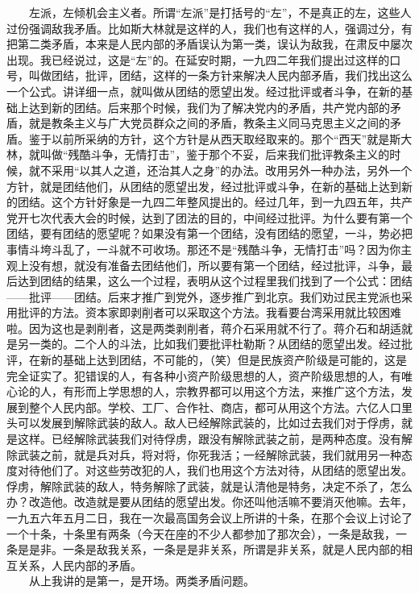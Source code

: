 \documentclass[cn,11pt,chinese]{elegantbook}
\begin{document}
　　左派，左倾机会主义者。所谓“左派”是打括号的“左”，不是真正的左，这些人过份强调敌我矛盾。比如斯大林就是这样的人，我们也有这样的人，强调过分，有把第二类矛盾，本来是人民内部的矛盾误认为第一类，误认为敌我，在肃反中屡次出现。我已经说过，这是“左”的。在延安时期，一九四二年我们提出过这样的口号，叫做团结，批评，团结，这样的一条方针来解决人民内部矛盾，我们找出这么一个公式。讲详细一点，就叫做从团结的愿望出发。经过批评或者斗争，在新的基础上达到新的团结。后来那个时候，我们为了解决党内的矛盾，共产党内部的矛盾，就是教条主义与广大党员群众之间的矛盾，教条主义同马克思主义之间的矛盾。鉴于以前所采纳的方针，这个方针是从西天取经取来的。那个“西天”就是斯大林，就叫做“残酷斗争，无情打击”，鉴于那个不妥，后来我们批评教条主义的时候，就不采用“以其人之道，还治其人之身”的办法。改用另外一种办法，另外一个方针，就是团结他们，从团结的愿望出发，经过批评或斗争，在新的基础上达到新的团结。这个方针好象是一九四二年整风提出的。经过几年，到一九四五年，共产党开七次代表大会的时候，达到了团法的目的，中间经过批评。为什么要有第一个团结，要有团结的愿望呢？如果没有第一个团结，没有团结的愿望，一斗，势必把事情斗垮斗乱了，一斗就不可收场。那还不是“残酷斗争，无情打击”吗？因为你主观上没有想，就没有准备去团结他们，所以要有第一个团结，经过批评，斗争，最后达到团结的结果，这么一个过程，表明从这个过程里我们找到了一个公式：团结——批评——团结。后来才推广到党外，逐步推广到北京。我们劝过民主党派也采用批评的方法。资本家即剥削者可以采取这个方法。我看要台湾采用就比较困难啦。因为这也是剥削者，这是两类剥削者，蒋介石采用就不行了。蒋介石和胡适就是另一类的。二个人的斗法，比如我们要批评杜勒斯？从团结的愿望出发。经过批评，在新的基础上达到团结，不可能的，（笑）但是民族资产阶级是可能的，这是完全证实了。犯错误的人，有各种小资产阶级思想的人，资产阶级思想的人，有唯心论的人，有形而上学思想的人，宗教界都可以用这个方法，来推广这个方法，发展到整个人民内部。学校、工厂、合作社、商店，都可从用这个方法。六亿人口里头可以发展到解除武装的敌人。敌人已经解除武装的，比如过去我们对于俘虏，就是这样。已经解除武装我们对待俘虏，跟没有解除武装之前，是两种态度。没有解除武装之前，就是兵对兵，将对将，你死我活；一经解除武装，我们就用另一种态度对待他们了。对这些劳改犯的人，我们也用这个方法对待，从团结的愿望出发。俘虏，解除武装的敌人，特务解除了武装，就是认清他是特务，决定不杀了，怎么办？改造他。改造就是要从团结的愿望出发。你还叫他活嘛不要消灭他嘛。去年，一九五六年五月二日，我在一次最高国务会议上所讲的十条，在那个会议上讨论了一个十条，十条里有两条（今天在座的不少人都参加了那次会），一条是敌我，一条是是非。一条是敌我关系，一条是是非关系，所谓是非关系，就是人民内部的相互关系，人民内部的矛盾。\\
　　从上我讲的是第一，是开场。两类矛盾问题。\\
\end{document}
